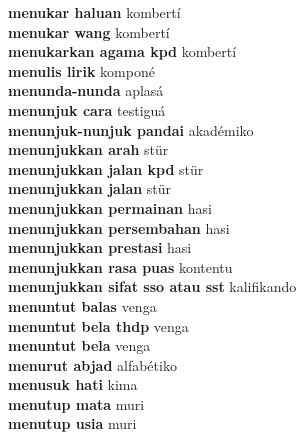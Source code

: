 \textbf{ menukar haluan  } kombertí \\
\textbf{ menukar wang  } kombertí \\
\textbf{ menukarkan agama kpd  } kombertí \\
\textbf{ menulis lirik  } komponé \\
\textbf{ menunda-nunda  } aplasá \\
\textbf{ menunjuk cara  } testiguá \\
\textbf{ menunjuk-nunjuk pandai  } akadémiko \\
\textbf{ menunjukkan arah  } stür \\
\textbf{ menunjukkan jalan kpd  } stür \\
\textbf{ menunjukkan jalan  } stür \\
\textbf{ menunjukkan permainan  } hasi \\
\textbf{ menunjukkan persembahan  } hasi \\
\textbf{ menunjukkan prestasi  } hasi \\
\textbf{ menunjukkan rasa puas  } kontentu \\
\textbf{ menunjukkan sifat sso atau sst  } kalifikando \\
\textbf{ menuntut balas  } venga \\
\textbf{ menuntut bela thdp  } venga \\
\textbf{ menuntut bela  } venga \\
\textbf{ menurut abjad  } alfabétiko \\
\textbf{ menusuk hati  } kima \\
\textbf{ menutup mata  } muri \\
\textbf{ menutup usia  } muri \\
